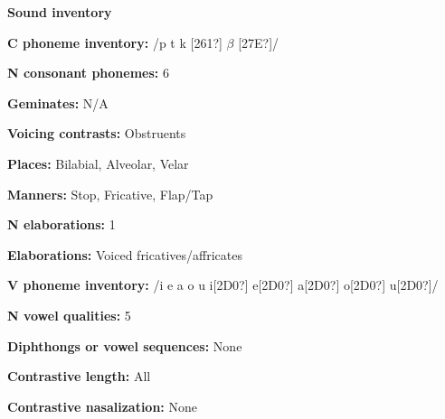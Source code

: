 \begin{styleBody}
\textbf{Sound inventory}
\end{styleBody}

\begin{styleBody}
\textbf{C phoneme inventory:} /p t k [261?] $\beta $ [27E?]/
\end{styleBody}

\begin{styleBody}
\textbf{N consonant phonemes:} 6
\end{styleBody}

\begin{styleBody}
\textbf{Geminates:} N/A
\end{styleBody}

\begin{styleBody}
\textbf{Voicing contrasts:} Obstruents
\end{styleBody}

\begin{styleBody}
\textbf{Places:} Bilabial, Alveolar, Velar
\end{styleBody}

\begin{styleBody}
\textbf{Manners:} Stop, Fricative, Flap/Tap
\end{styleBody}

\begin{styleBody}
\textbf{N elaborations:} 1
\end{styleBody}

\begin{styleBody}
\textbf{Elaborations:} Voiced fricatives/affricates
\end{styleBody}

\begin{styleBody}
\textbf{V phoneme inventory:} /i e a o u i[2D0?] e[2D0?] a[2D0?] o[2D0?] u[2D0?]/
\end{styleBody}

\begin{styleBody}
\textbf{N vowel qualities:} 5
\end{styleBody}

\begin{styleBody}
\textbf{Diphthongs or vowel sequences:} None
\end{styleBody}

\begin{styleBody}
\textbf{Contrastive length:} All
\end{styleBody}

\begin{styleBody}
\textbf{Contrastive nasalization:} None
\end{styleBody}

